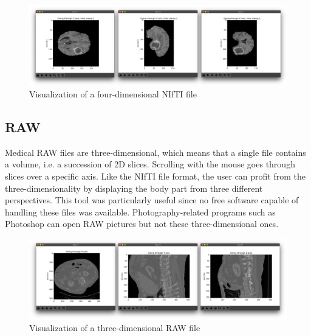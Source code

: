 \begin{figure}[!h]
\centering
\includegraphics[width=\textwidth, keepaspectratio=true]{./figures/visualize_brain_nii.png}
\caption{Visualization of a four-dimensional NIfTI file}
\label{fig:visualize_brain_nii}
\end{figure}


\subsection{RAW}
\setlength{\marginparwidth}{3cm}\leavevmode {}Medical RAW files are three-dimensional, which means that a single file contains a volume, i.e. a succession of 2D slices. Scrolling with the mouse goes through slices over a specific axis. Like the NIfTI file format, the user can profit from the three-dimensionality by displaying the body part from three different perspectives. This tool was particularly useful since no free software capable of handling these files was available. Photography-related programs such as Photoshop can open RAW pictures but not these three-dimensional ones. 

\begin{figure}[!h]
\centering
\includegraphics[width=\textwidth, keepaspectratio=true]{./figures/visualize_liver_raw.png}
\caption{Visualization of a three-dimensional RAW file}
\label{fig:visualize_liver_raw}
\end{figure}


